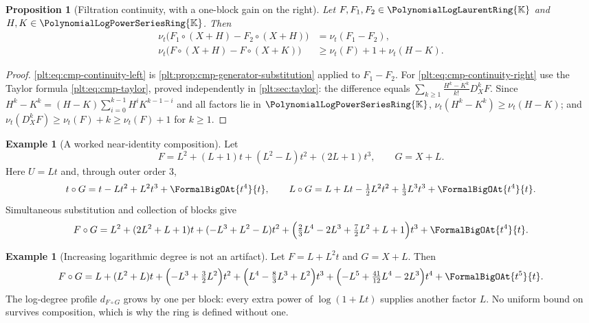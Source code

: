 \documentclass[11pt,oneside]{article}
\theoremstyle{plain}
\newtheorem{proposition}[theorem]{Proposition}
\theoremstyle{definition}
\newtheorem{example}[theorem]{Example}
\theoremstyle{remark}
\newcommand{\K}{\mathbb{K}}
\newcommand{\PLpow}{\PolynomialLogPowerSeriesRing{\K}}   %
\newcommand{\PLlau}{\PolynomialLogLaurentRing{\K}}       %
\newcommand{\ordt}{\nu_{t}}                              %
\DeclareMathOperator{\degL}{deg_{L}}
\newcommand{\DX}{D_{X}}                                  %
\newcommand{\compose}{\mathbin{\circ}}
\newcommand{\dprofile}[1]{d_{#1}}                        %
\begin{document}
\begin{proposition}[Filtration continuity, with a one-block gain on the right]
\label{plt:prop:cmp-filtration-continuity}
Let \(F,F_1,F_2\in\PLlau\) and \(H,K\in\PLpow\).  Then
\begin{align}
 \ordt\bigl(F_1\compose(X+H)-F_2\compose(X+H)\bigr)
 &=\ordt(F_1-F_2),
 \label{plt:eq:cmp-continuity-left}\\
 \ordt\bigl(F\compose(X+H)-F\compose(X+K)\bigr)
 &\ge\ordt(F)+1+\ordt(H-K).
 \label{plt:eq:cmp-continuity-right}
\end{align}
\end{proposition}

\begin{proof}
\eqref{plt:eq:cmp-continuity-left} is
\cref{plt:prop:cmp-generator-substitution} applied to \(F_1-F_2\).  For
\eqref{plt:eq:cmp-continuity-right} use the Taylor formula
\eqref{plt:eq:cmp-taylor}, proved independently in
\cref{plt:sec:taylor}: the difference equals
\(\sum_{k\ge1}\frac{H^{k}-K^{k}}{k!}\DX^{k}F\).  Since
\(H^{k}-K^{k}=(H-K)\sum_{i=0}^{k-1}H^{i}K^{k-1-i}\) and all factors lie in
\(\PLpow\), \(\ordt(H^{k}-K^{k})\ge\ordt(H-K)\); and
\(\ordt(\DX^{k}F)\ge\ordt(F)+k\ge\ordt(F)+1\) for \(k\ge1\).
\end{proof}

\begin{example}[A worked near-identity composition]
\label{plt:ex:cmp-worked-near-identity}
Let
\[
 F=L^{2}+(L+1)t+(L^{2}-L)t^{2}+(2L+1)t^{3},
 \qquad
 G=X+L .
\]
Here \(U=Lt\) and, through outer order \(3\),
\[
 t\compose G=t-Lt^{2}+L^{2}t^{3}+\FormalBigOAt{t^{4}}{t},
 \qquad
 L\compose G=L+Lt-\tfrac12L^{2}t^{2}+\tfrac13L^{3}t^{3}
  +\FormalBigOAt{t^{4}}{t}.
\]
Simultaneous substitution and collection of blocks give
\begin{equation}\label{plt:eq:cmp-worked}
 F\compose G
 =L^{2}+(2L^{2}+L+1)t+(-L^{3}+L^{2}-L)t^{2}
  +\Bigl(\tfrac23L^{4}-2L^{3}+\tfrac72L^{2}+L+1\Bigr)t^{3}
  +\FormalBigOAt{t^{4}}{t}.
\end{equation}
\end{example}

\begin{example}[Increasing logarithmic degree is not an artifact]
\label{plt:ex:cmp-log-degree-growth}
Let \(F=L+L^{2}t\) and \(G=X+L\).  Then
\[
 F\compose G
 =L+(L^{2}+L)t+\Bigl(-L^{3}+\tfrac32L^{2}\Bigr)t^{2}
  +\Bigl(L^{4}-\tfrac83L^{3}+L^{2}\Bigr)t^{3}
  +\Bigl(-L^{5}+\tfrac{41}{12}L^{4}-2L^{3}\Bigr)t^{4}
  +\FormalBigOAt{t^{5}}{t}.
\]
The log-degree profile \(\dprofile{F\compose G}\) grows by one per block:
every extra power of \(\log(1+Lt)\) supplies another factor \(L\).  No
uniform bound on \(\degL\) survives composition, which is why the ring is
defined without one.
\end{example}
\end{document}
